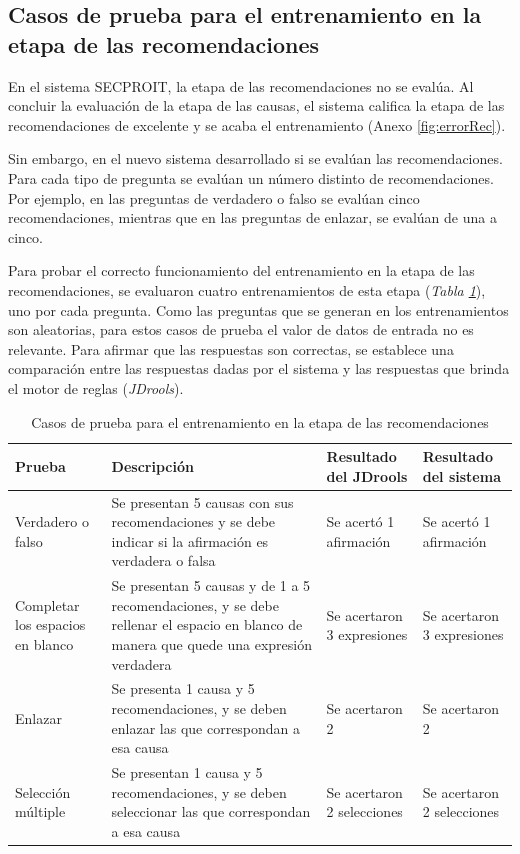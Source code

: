 \subsection{Casos de prueba para el entrenamiento en la etapa de las recomendaciones}
En el sistema SECPROIT, la etapa de las recomendaciones no se evalúa. Al concluir la evaluación de la etapa de las causas, el sistema califica la etapa de las recomendaciones de excelente y se acaba el entrenamiento (Anexo \ref{fig:errorRec}).

Sin embargo, en el nuevo sistema desarrollado si se evalúan las recomendaciones. Para cada tipo de pregunta se evalúan un número distinto de recomendaciones. Por ejemplo, en las preguntas de verdadero o falso se evalúan cinco recomendaciones, mientras que en las preguntas de enlazar, se evalúan de una a cinco.

Para probar el correcto funcionamiento del entrenamiento en la etapa de las recomendaciones, se evaluaron cuatro entrenamientos de esta etapa (\textsl{Tabla \ref{cas:reco}}), uno por cada pregunta. Como las preguntas que se generan en los entrenamientos son aleatorias, para estos casos de prueba el valor de datos de entrada no es relevante. Para afirmar que las respuestas son correctas, se establece una comparación entre las respuestas dadas por el sistema y las respuestas que brinda el motor de reglas (\textsl{JDrools}).

\begin{table}[H]
\begin{center}
\begin{tabular}{ | p{2.7cm} | p{6.2cm} | p{2.6cm} | p{2.6cm} |}
\hline
\centering\textbf{Prueba} & \textbf{Descripción} & \textbf{Resultado del JDrools} & \textbf{Resultado del sistema} \\
\hline
Verdadero o \break falso & Se presentan 5 causas con sus recomendaciones y se debe indicar si la afirmación es verdadera o falsa & Se acertó 1 afirmación &  Se acertó 1 afirmación \\
\hline
Completar los espacios en blanco & Se presentan 5 causas y de 1 a 5 recomendaciones, y se debe rellenar el espacio en blanco de manera que quede una expresión verdadera & Se acertaron 3 expresiones &  Se acertaron 3 expresiones \\
\hline
Enlazar & Se presenta 1 causa y 5 recomendaciones, y se deben enlazar las que correspondan a esa causa & Se acertaron 2 &  Se acertaron 2 \\
\hline
Selección múltiple & Se presentan 1 causa y 5 recomendaciones, y se deben seleccionar las que correspondan a esa causa & Se acertaron 2 selecciones &  Se acertaron 2 selecciones \\
\hline
\end{tabular}
\caption{Casos de prueba para el entrenamiento en la etapa de las recomendaciones}
\label{cas:reco}
\end{center}
\end{table}

